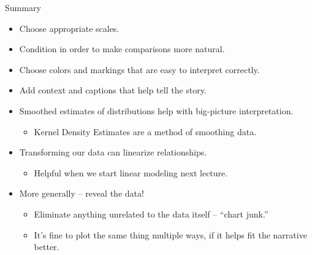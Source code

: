 \documentclass[aspectratio=169]{../latex_main/tntbeamer}  %
\begin{document}
	\begin{frame}{Summary}
	    \begin{itemize}
	        \item Choose appropriate scales.
	        \item Condition in order to make comparisons more natural.
	        \item Choose colors and markings that are easy to interpret correctly.
	        \item Add context and captions that help tell the story.
	        \item Smoothed estimates of distributions help with big-picture interpretation.
	        \begin{itemize}
	            \item Kernel Density Estimates are a method of smoothing data.
	        \end{itemize}
	        \item Transforming our data can linearize relationships.
	        \begin{itemize}
	            \item Helpful when we start linear modeling next lecture.
	        \end{itemize}
	        \item More generally – reveal the data!
	        \begin{itemize}
	            \item Eliminate anything unrelated to the data itself – “chart junk.”
	            \item It’s fine to plot the same thing multiple ways, if it helps fit the narrative better.
	        \end{itemize}
	    \end{itemize}
	\end{frame}
\end{document}
